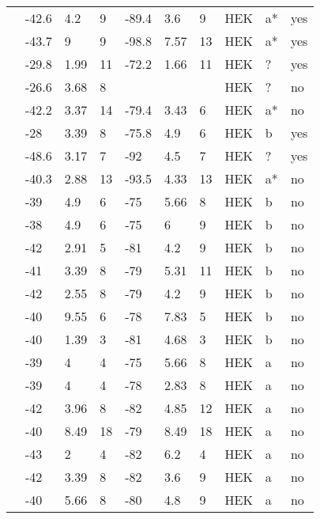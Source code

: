 \begin{longtable}{p{5cm}|lll|lll|lll}
\citet{Smits2005aMutationDB} & -42.6 & 4.2 & 9 & -89.4 & 3.6 & 9 & HEK & a* & yes \\
\citet{Smits2005bMutationDB} & -43.7 & 9 & 9 & -98.8 & 7.57 & 13 & HEK & a* & yes \\
\citet{Sottas2013MutationDB} & -29.8 & 1.99 & 11 & -72.2 & 1.66 & 11 & HEK & ? & yes \\
\citet{Splawski2002MutationDB} & -26.6 & 3.68 & 8 & && & HEK & ? & no \\
\citet{Surber2008MutationDB} & -42.2 & 3.37 & 14 & -79.4 & 3.43 & 6 & HEK & a* & no \\
\citet{Swan2014MutationDB} & -28 & 3.39 & 8 & -75.8 & 4.9 & 6 & HEK & b & yes \\
\citet{Tan2001MutationDB} & -48.6 & 3.17 & 7 & -92 & 4.5 & 7 & HEK & ? & yes \\
\citet{Tan2002MutationDB} & -40.3 & 2.88 & 13 & -93.5 & 4.33 & 13 & HEK & a* & no \\
\citet{Tan2005MutationDB} & -39 & 4.9 & 6 & -75 & 5.66 & 8 & HEK & b & no \\
\citet{Tan2005MutationDB} & -38 & 4.9 & 6 & -75 & 6 & 9 & HEK & b & no \\
\citet{Tan2005MutationDB} & -42 & 2.91 & 5 & -81 & 4.2 & 9 & HEK & b & no \\
\citet{Tan2005MutationDB} & -41 & 3.39 & 8 & -79 & 5.31 & 11 & HEK & b & no \\
\citet{Tan2005MutationDB} & -42 & 2.55 & 8 & -79 & 4.2 & 9 & HEK & b & no \\
\citet{Tan2005MutationDB} & -40 & 9.55 & 6 & -78 & 7.83 & 5 & HEK & b & no \\
\citet{Tan2005MutationDB} & -40 & 1.39 & 3 & -81 & 4.68 & 3 & HEK & b & no \\
\citet{Tan2005MutationDB} & -39 & 4 & 4 & -75 & 5.66 & 8 & HEK & a & no \\
\citet{Tan2005MutationDB} & -39 & 4 & 4 & -78 & 2.83 & 8 & HEK & a & no \\
\citet{Tan2005MutationDB} & -42 & 3.96 & 8 & -82 & 4.85 & 12 & HEK & a & no \\
\citet{Tan2005MutationDB} & -40 & 8.49 & 18 & -79 & 8.49 & 18 & HEK & a & no \\
\citet{Tan2005MutationDB} & -43 & 2 & 4 & -82 & 6.2 & 4 & HEK & a & no \\
\citet{Tan2005MutationDB} & -42 & 3.39 & 8 & -82 & 3.6 & 9 & HEK & a & no \\
\citet{Tan2005MutationDB} & -40 & 5.66 & 8 & -80 & 4.8 & 9 & HEK & a & no \\

\end{longtable}
